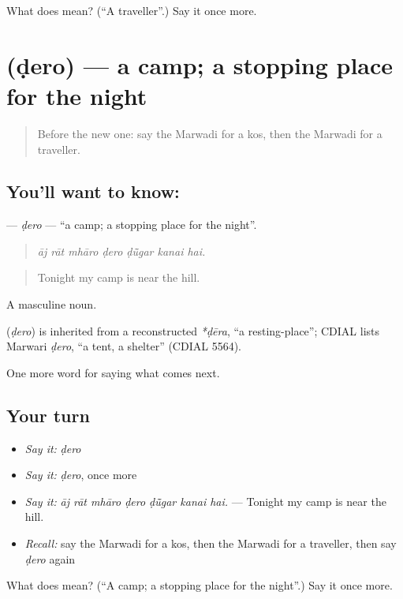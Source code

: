 \begin{tcolorbox}[breakable,colback=teal!4,colframe=teal!35!black,title={Before you move on}]
What does  mean? (\textquotedblleft{}A traveller\textquotedblright{}.) Say it once more.
\end{tcolorbox}
\section[\texorpdfstring{\mw{डेरो} (ḍero)}{डेरो (ḍero)}]{ (ḍero) — a camp; a stopping place for the night}

\label{lesson:MW-C216-dero}



\begin{quote}
Before the new one: say the Marwadi for a kos, then the Marwadi for a traveller.
\end{quote}

\subsection*{You'll want to know: }
\textbf{} — \emph{ḍero} — \textquotedblleft{}a camp; a stopping place for the night\textquotedblright{}.

\begin{quote}
      
\end{quote}

\begin{quote}
\emph{āj rāt mhāro ḍero ḍū̃gar kanai hai.}
\end{quote}

\begin{quote}
Tonight my camp is near the hill.
\end{quote}

A masculine noun.

\begin{cousinweb}
\textbf{} (\emph{ḍero}) is inherited from a reconstructed \emph{*ḍēra}, \textquotedblleft{}a resting-place\textquotedblright{}; CDIAL lists Marwari \emph{ḍero}, \textquotedblleft{}a tent, a shelter\textquotedblright{} (CDIAL 5564).
\end{cousinweb}

\begin{grammarlens}[title={What you've built}]
One more word for saying what comes next.
\end{grammarlens}

\subsection*{Your turn}
\begin{itemize}
\raggedright
  \item \emph{Say it:} \emph{ḍero}
  \item \emph{Say it:} \emph{ḍero}, once more
  \item \emph{Say it:} \emph{āj rāt mhāro ḍero ḍū̃gar kanai hai.} — Tonight my camp is near the hill.
  \item \emph{Recall:} say the Marwadi for a kos, then the Marwadi for a traveller, then say \emph{ḍero} again
\end{itemize}

\begin{tcolorbox}[breakable,colback=teal!4,colframe=teal!35!black,title={Before you move on}]
What does  mean? (\textquotedblleft{}A camp; a stopping place for the night\textquotedblright{}.) Say it once more.
\end{tcolorbox}

